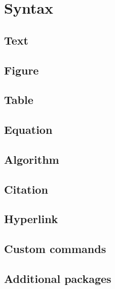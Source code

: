 \section{Syntax}

\subsection{Text}
\subsection{Figure}
\subsection{Table}
\subsection{Equation}
\subsection{Algorithm}
\subsection{Citation}
\subsection{Hyperlink}
\subsection{Custom commands}
\subsection{Additional packages}
